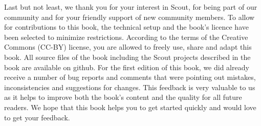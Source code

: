 \documentclass[a4paper,10pt,twoside]{book}
\begin{document}
Last but not least, we thank you for your interest in Scout, for being part of our community and for your friendly support of new community members.
To allow for contributions to this book, the technical setup and the book's licence have been selected to minimize restrictions. 
According to the terms of the Creative Commons (CC-BY) license, you are allowed to freely use, share and adapt this book. 
All source files of the book including the Scout projects described in the book are available on github.
For the first edition of this book, we did already receive a number of bug reports and comments that were pointing out mistakes, inconsistencies and suggestions for changes. 
This feedback is very valuable to us as it helps to improve both the book's content and the quality for all future readers. 
We hope that this book helps you to get started quickly and would love to get your feedback. 


\ifx\wholebook\relax\else
   
   
\end{document}
